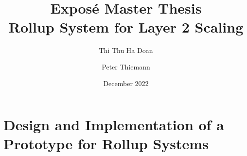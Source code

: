 \documentclass{article}
\title{Expos\'{e} Master Thesis\\
  Rollup System for Layer 2 Scaling}
\author{Thi Thu Ha Doan \and  Peter Thiemann}
\date{December 2022}
\begin{document}
\maketitle

\section{Design and Implementation of a Prototype for Rollup Systems}




\end{document}
